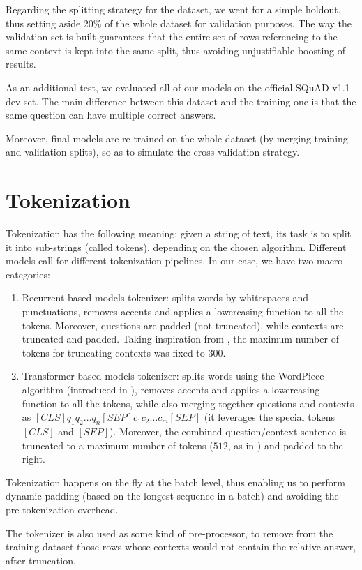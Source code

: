 \documentclass[a4paper,10pt]{report}
\begin{document}
Regarding the splitting strategy for the dataset, we went for a simple holdout, thus setting aside $20\%$ of the whole dataset for validation purposes. The way the validation set is built guarantees that the entire set of rows referencing to the same context is kept into the same split, thus avoiding unjustifiable boosting of results.

As an additional test, we evaluated all of our models on the official SQuAD v1.1 dev set. The main difference between this dataset and the training one is that the same question can have multiple correct answers.

Moreover, final models are re-trained on the whole dataset (by merging training and validation splits), so as to simulate the cross-validation strategy.

\section{Tokenization}\label{sec:tokenization}
Tokenization has the following meaning: given a string of text, its task is to split it into sub-strings (called tokens), depending on the chosen algorithm. Different models call for different tokenization pipelines. In our case, we have two macro-categories:
\begin{enumerate}
  \item Recurrent-based models tokenizer: splits words by whitespaces and punctuations, removes accents and applies a lowercasing function to all the tokens. Moreover, questions are padded (not truncated), while contexts are truncated and padded. Taking inspiration from \cite{max-context-tokens}, the maximum number of tokens for truncating contexts was fixed to $300$.
  \item Transformer-based models tokenizer: splits words using the WordPiece algorithm (introduced in \cite{wordpiece}), removes accents and applies a lowercasing function to all the tokens, while also merging together questions and contexts as $[CLS] q_1 q_2 \dots q_n [SEP] c_1 c_2 \dots c_m [SEP]$ (it leverages the special tokens $[CLS]$ and $[SEP]$). Moreover, the combined question/context sentence is truncated to a maximum number of tokens ($512$, as in \cite{bert}) and padded to the right.
\end{enumerate}
Tokenization happens on the fly at the batch level, thus enabling us to perform dynamic padding (based on the longest sequence in a batch) and avoiding the pre-tokenization overhead.

The tokenizer is also used as some kind of pre-processor, to remove from the training dataset those rows whose contexts would not contain the relative answer, after truncation.
\end{document}
